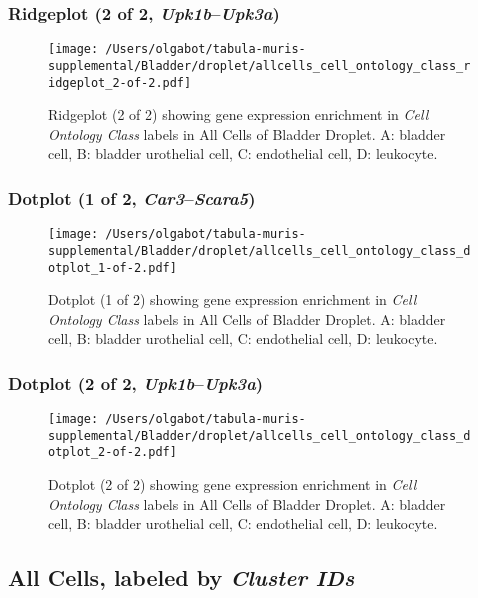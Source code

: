 \clearpage

\subsubsection{Ridgeplot (2 of 2, \emph{Upk1b}--\emph{Upk3a})}
\begin{figure}[h]
\centering
\texttt{[image: /Users/olgabot/tabula-muris-supplemental/Bladder/droplet/allcells\_cell\_ontology\_class\_ridgeplot\_2-of-2.pdf]}

\caption{ Ridgeplot (2 of 2)  showing gene expression enrichment in \emph{Cell Ontology Class} labels in All Cells of Bladder Droplet. A: bladder cell, B: bladder urothelial cell, C: endothelial cell, D: leukocyte.}
\end{figure}


\clearpage

\subsubsection{Dotplot (1 of 2, \emph{Car3}--\emph{Scara5})}
\begin{figure}[h]
\centering
\texttt{[image: /Users/olgabot/tabula-muris-supplemental/Bladder/droplet/allcells\_cell\_ontology\_class\_dotplot\_1-of-2.pdf]}

\caption{ Dotplot (1 of 2)  showing gene expression enrichment in \emph{Cell Ontology Class} labels in All Cells of Bladder Droplet. A: bladder cell, B: bladder urothelial cell, C: endothelial cell, D: leukocyte.}
\end{figure}


\clearpage

\subsubsection{Dotplot (2 of 2, \emph{Upk1b}--\emph{Upk3a})}
\begin{figure}[h]
\centering
\texttt{[image: /Users/olgabot/tabula-muris-supplemental/Bladder/droplet/allcells\_cell\_ontology\_class\_dotplot\_2-of-2.pdf]}

\caption{ Dotplot (2 of 2)  showing gene expression enrichment in \emph{Cell Ontology Class} labels in All Cells of Bladder Droplet. A: bladder cell, B: bladder urothelial cell, C: endothelial cell, D: leukocyte.}
\end{figure}


\clearpage

\subsection{All Cells, labeled by \emph{Cluster IDs}}
